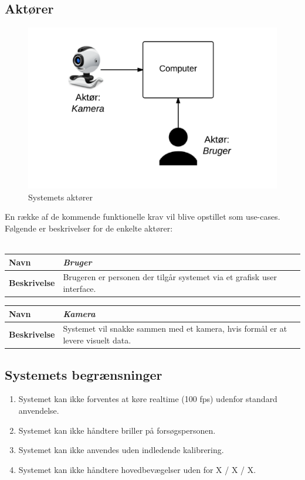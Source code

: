 \documentclass[kravspec.tex]{subfiles}
\begin{document}
\subsection{Aktører}
\begin{figure}[h]
\centering
\includegraphics[width=0.7\linewidth]{../Actors}
\caption{Systemets aktører}
\label{fig:Actors}
\end{figure}

En række af de kommende funktionelle krav vil blive opstillet som use-cases. Følgende er beskrivelser for de enkelte aktører: \\
\\
\begin{tabular}{| l | p{10cm} |}
	\hline 
	\textbf{Navn} & \textit{Bruger} \\ \hline
	\textbf{Beskrivelse} & Brugeren er personen der tilgår systemet via et grafisk user interface.\\ \hline
\end{tabular}
\newline
\vspace*{0.7 cm}
\newline
\begin{tabular}{| l | p{10cm} |}
	\hline 
	\textbf{Navn} & \textit{Kamera} \\ \hline
	\textbf{Beskrivelse} & Systemet vil snakke sammen med et kamera, hvis formål er at levere visuelt data.\\ \hline
\end{tabular}

\subsection{Systemets begrænsninger}
\begin{enumerate}
	\item Systemet kan ikke forventes at køre realtime (100 fps) udenfor standard anvendelse.
\item 
Systemet kan ikke håndtere briller på forsøgspersonen.
\item 
Systemet kan ikke anvendes uden indledende kalibrering.
\item 
Systemet kan ikke håndtere hovedbevægelser uden for X / X / X.
\end{enumerate}
\end{document}
